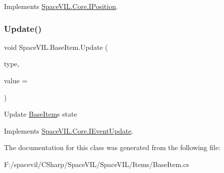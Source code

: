 Implements \mbox{\hyperlink{interface_space_v_i_l_1_1_core_1_1_i_position}{Space\+V\+I\+L.\+Core.\+I\+Position}}.

\mbox{\label{class_space_v_i_l_1_1_base_item_aec3ac6bb0e7d814b478d89b93f8e3d18}} 
\subsubsection{\texorpdfstring{Update()}{Update()}}
{\footnotesize\ttfamily void Space\+V\+I\+L.\+Base\+Item.\+Update (\begin{DoxyParamCaption}\item[{Geometry\+Event\+Type}]{type,  }\item[{int}]{value = {} }\end{DoxyParamCaption})}



Update \mbox{\hyperlink{class_space_v_i_l_1_1_base_item}{Base\+Item}}\textquotesingle{}s state 



Implements \mbox{\hyperlink{interface_space_v_i_l_1_1_core_1_1_i_event_update}{Space\+V\+I\+L.\+Core.\+I\+Event\+Update}}.



The documentation for this class was generated from the following file\+:\begin{DoxyCompactItemize}
\item 
F\+:/spacevil/\+C\+Sharp/\+Space\+V\+I\+L/\+Space\+V\+I\+L/\+Items/Base\+Item.\+cs\end{DoxyCompactItemize}
